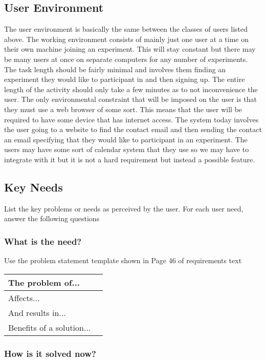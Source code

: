 \documentclass{article}
\begin{document}
\subsection{User Environment}
The user environment is basically the same between the classes of users listed above. The working environment consists of mainly just one user at a time on their own machine joining an experiment. This will stay constant but there may be many users at once on separate computers for any number of experiments. The task length should be fairly minimal and involves them finding an experiment they would like to participant in and then signing up. The entire length of the activity should only take a few minutes as to not inconvenience the user. The only environmental constraint that will be imposed on the user is that they must use a web browser of some sort. This means that the user will be required to have some device that has internet access. The system today involves the user going to a website to find the contact email and then sending the contact an email specifying that they would like to participant in an experiment. The users may have some sort of calendar system that they use so we may have to integrate with it but it is not a hard requirement but instead a possible feature.

\subsection{Key Needs}
List the key problems or needs as perceived by the user. For each user need, answer the following questions

\subsubsection{What is the need?}
Use the problem statement template shown in Page 46 of requirements text
\begin{table}[!hb]
    \begin{tabular}{|l|l|}
        \hline
        The problem of... &  \\ \hline
        Affects... &  \\ \hline
        And results in... &  \\ \hline
        Benefits of a solution... &  \\ \hline
    \end{tabular}
\end{table}
\subsubsection{How is it solved now?}
\end{document}
